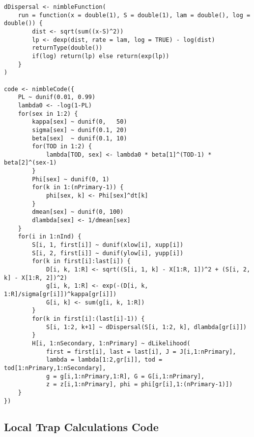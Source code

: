 \begin{singlespace}
\begin{small}
\begin{verbatim}
dDispersal <- nimbleFunction(
    run = function(x = double(1), S = double(1), lam = double(), log = double()) {
        dist <- sqrt(sum((x-S)^2))
        lp <- dexp(dist, rate = lam, log = TRUE) - log(dist)
        returnType(double())
        if(log) return(lp) else return(exp(lp))
    }
)

code <- nimbleCode({
    PL ~ dunif(0.01, 0.99)
    lambda0 <- -log(1-PL)
    for(sex in 1:2) {
        kappa[sex] ~ dunif(0,   50)
        sigma[sex] ~ dunif(0.1, 20)
        beta[sex]  ~ dunif(0.1, 10)
        for(TOD in 1:2) {
            lambda[TOD, sex] <- lambda0 * beta[1]^(TOD-1) * beta[2]^(sex-1)
        }
        Phi[sex] ~ dunif(0, 1)
        for(k in 1:(nPrimary-1)) {
            phi[sex, k] <- Phi[sex]^dt[k]
        }
        dmean[sex] ~ dunif(0, 100)
        dlambda[sex] <- 1/dmean[sex]
    }
    for(i in 1:nInd) {
        S[i, 1, first[i]] ~ dunif(xlow[i], xupp[i])
        S[i, 2, first[i]] ~ dunif(ylow[i], yupp[i])
        for(k in first[i]:last[i]) {
            D[i, k, 1:R] <- sqrt((S[i, 1, k] - X[1:R, 1])^2 + (S[i, 2, k] - X[1:R, 2])^2)
            g[i, k, 1:R] <- exp(-(D[i, k, 1:R]/sigma[gr[i]])^kappa[gr[i]])
            G[i, k] <- sum(g[i, k, 1:R])
        }
        for(k in first[i]:(last[i]-1)) {
            S[i, 1:2, k+1] ~ dDispersal(S[i, 1:2, k], dlambda[gr[i]])
        }
        H[i, 1:nSecondary, 1:nPrimary] ~ dLikelihood(
            first = first[i], last = last[i], J = J[i,1:nPrimary],
            lambda = lambda[1:2,gr[i]], tod = tod[1:nPrimary,1:nSecondary],
            g = g[i,1:nPrimary,1:R], G = G[i,1:nPrimary],
            z = z[i,1:nPrimary], phi = phi[gr[i],1:(nPrimary-1)])
    }
})
\end{verbatim}
\end{small}
\end{singlespace}





\newpage
\subsection{Local Trap Calculations Code}

